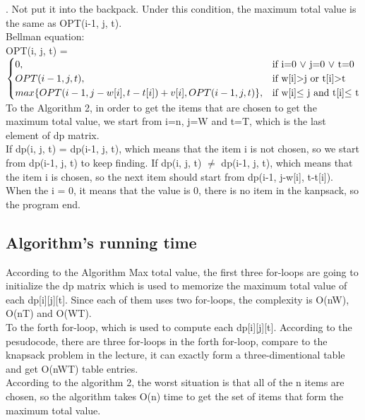 \documentclass[]{article}
\begin{document}
  	. Not put it into the backpack. Under this condition, the maximum total value is the same as OPT(i-1, j, t).  \\
	
	\noindent Bellman equation: \\
	
	OPT(i, j, t) =
	$\begin{cases} 
		0,  & \mbox{if }\mbox{i=0 $\lor$ j=0 $\lor$ t=0} \\
		OPT(i-1, j, t),  & \mbox{if }\mbox{w[i]\textgreater j or t[i]\textgreater t} \\
		max\{OPT(i-1, j-w[i], t-t[i]) + v[i], OPT(i-1, j, t)\},  & \mbox{if }\mbox{w[i]$\leq$ j and t[i]$\leq$ t}
	\end{cases}$ \\

	\noindent To the Algorithm 2, in order to get the items that are chosen to get the maximum total value, we start from i=n, j=W and t=T, which is the last element of dp matrix.   \\
	
	\noindent If dp(i, j, t) = dp(i-1, j, t), which means that the item i is not chosen, so we start from dp(i-1, j, t) to keep finding. If dp(i, j, t) $\neq$ dp(i-1, j, t), which means that the item i is chosen, so the next item should start from dp(i-1, j-w[i], t-t[i]). When the i = 0, it means that the value is 0, there is no item in the kanpsack, so the program end.    \\
	
	\subsection{Algorithm's running time}
	
	\noindent According to the Algorithm Max total value, the first three for-loops are going to initialize the dp matrix which is used to memorize the maximum total value of each dp[i][j][t]. Since each of them uses two for-loops, the complexity is O(nW), O(nT) and O(WT).  \\
	
	\noindent To the forth for-loop, which is used to compute each dp[i][j][t]. According to the pesudocode, there are three for-loops in the forth for-loop, compare to the knapsack problem in the lecture, it can exactly form a three-dimentional table and get O(nWT) table entries. \\
	
	\noindent According to the algorithm 2, the worst situation is that all of the n items are chosen, so the algorithm takes O(n) time to get the set of items that form the maximum total value.  \\
	
\end{document}
